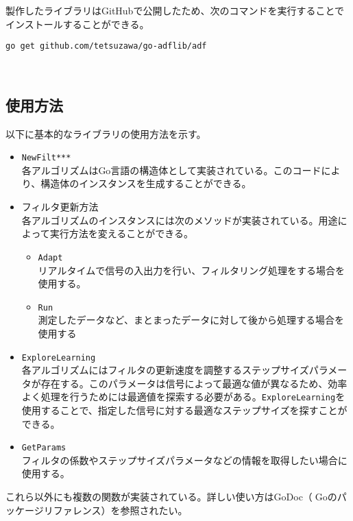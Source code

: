 製作したライブラリはGitHub\cite{go-adflib:online}で公開したため、次のコマンドを実行することでインストールすることができる。

\texttt{go\ get\ github.com/tetsuzawa/go-adflib/adf}

\
\subsection{使用方法}\label{how-to-use}

以下に基本的なライブラリの使用方法を示す。

\begin{itemize}
\tightlist
\item
  \texttt{NewFilt***} \\ 
  各アルゴリズムはGo言語の構造体として実装されている。このコードにより、構造体のインスタンスを生成することができる。
\item
  フィルタ更新方法 \\
  各アルゴリズムのインスタンスには次のメソッドが実装されている。用途によって実行方法を変えることができる。

  \begin{itemize}
  \tightlist
  \item
    \texttt{Adapt} \\
    リアルタイムで信号の入出力を行い、フィルタリング処理をする場合を使用する。
  \item
    \texttt{Run} \\
    測定したデータなど、まとまったデータに対して後から処理する場合を使用する
  \end{itemize}
\item
  \texttt{ExploreLearning} \\
  各アルゴリズムにはフィルタの更新速度を調整するステップサイズパラメータが存在する。このパラメータは信号によって最適な値が異なるため、効率よく処理を行うためには最適値を探索する必要がある。\texttt{ExploreLearning}を使用することで、指定した信号に対する最適なステップサイズを探すことができる。
\item
  \texttt{GetParams} \\
  フィルタの係数やステップサイズパラメータなどの情報を取得したい場合に使用する。
\end{itemize}

これら以外にも複数の関数が実装されている。詳しい使い方はGoDoc（Goのパッケージリファレンス）\cite{godoc:online}を参照されたい。
